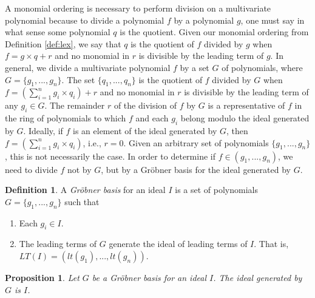 \documentclass{msthesis}
\newtheorem{prop}[theorem]{Proposition}
\theoremstyle{definition}
\newtheorem{definition}[theorem]{Definition}
\begin{document}
A monomial ordering is necessary to perform division on a multivariate polynomial because to divide a polynomial $f$ by a polynomial $g$, one must say in what sense some polynomial $q$ is the quotient.  Given our monomial ordering from Definition \ref{def:lex}, we say that $q$ is the quotient of $f$ divided by $g$ when $f = g\times q + r$ and no monomial in $r$ is divisible by the leading term of $g$.  In general, we divide a multivariate polynomial $f$ by a set $G$ of polynomials, where $G = \{g_1, ..., g_n\}$.  The set $\{q_1, ..., q_n\}$ is the quotient of $f$ divided by $G$ when $f = (\sum_{i=1}^n g_i \times q_i) + r$ and no monomial in $r$ is divisible by the leading term of any $g_i \in G$.  The remainder $r$ of the division of $f$ by $G$ is a representative of $f$ in the ring of polynomials to which $f$ and each $g_i$ belong modulo the ideal generated by $G$. Ideally, if $f$ is an element of the ideal generated by $G$, then $f = (\sum_{i=1}^n g_i \times q_i)$, i.e., $r = 0$.  Given an arbitrary set of polynomials $\{g_1, ..., g_n\}$, this is not necessarily the case.  In order to determine if $f \in (g_1, ..., g_n)$, we need to divide $f$ not by $G$, but by a Gr\"{o}bner basis for the ideal generated by $G$.
\begin{definition}\label{def:gb}
    A \emph{Gr\"{o}bner basis} for an ideal $I$ is a set of polynomials $G=\{g_1, ..., g_n\}$ such that
    \begin{enumerate}[label=(\alph*),nosep]
        \item Each $g_i \in I$.
        \item The leading terms of $G$ generate the ideal of leading terms of $I$. That is, $LT(I) = (lt(g_1), ...,lt(g_n))$.
    \end{enumerate}
\end{definition}

\begin{prop}\label{prop:gbisi}
    Let $G$ be a Gr\"obner basis for an ideal $I$. The ideal generated by $G$ is $I$.
\end{prop}
\end{document}
